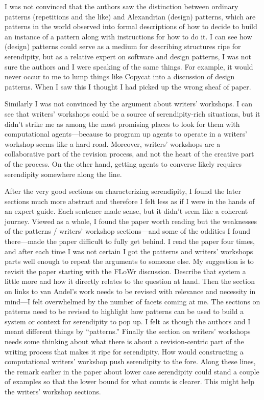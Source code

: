 I was not convinced that the authors saw the distinction between ordinary patterns (repetitions
and the like) and Alexandrian (design) patterns, which are patterns in the world observed into
formal descriptions of how to decide to build an instance of a pattern along with instructions for
how to do it. I can see how (design) patterns could serve as a medium for describing structures
ripe for serendipity, but as a relative expert on software and design patterns, I was not sure the
authors and I were speaking of the same things. For example, it would never occur to me to
lump things like Copycat into a discussion of design patterns. When I saw this I thought I had
picked up the wrong sheaf of paper.

Similarly I was not convinced by the argument about writers’ workshops. I can see that writers’
workshops could be a source of serendipity-rich situations, but it didn’t strike me as among the
most promising places to look for them with computational agents—because to program up
agents to operate in a writers’ workshop seems like a hard road. Moreover, writers’ workshops
are a collaborative part of the revision process, and not the heart of the creative part of the
process. On the other hand, getting agents to converse likely requires serendipity somewhere
along the line.

After the very good sections on characterizing serendipity, I found the later sections much more
abstract and therefore I felt less as if I were in the hands of an expert guide. Each sentence
made sense, but it didn’t seem like a coherent journey.
Viewed as a whole, I found the paper worth reading but the weaknesses of the patterns /
writers’ workshop sections—and some of the oddities I found there—made the paper difficult to
fully get behind. I read the paper four times, and after each time I was not certain I got the
patterns and writers’ workshops parts well enough to repeat the arguments to someone else.
My suggestion is to revisit the paper starting with the FLoWr discussion. Describe that system a
little more and how it directly relates to the question at hand. Then the section on links to van
Andel’s work needs to be revised with relevance and necessity in mind—I felt overwhelmed by
the number of facets coming at me. The sections on patterns need to be revised to highlight
how patterns can be used to build a system or context for serendipity to pop up. I felt as though
the authors and I meant different things by “patterns.” Finally the section on writers’ workshops
needs some thinking about what there is about a revision-centric part of the writing process that
makes it ripe for serendipity. How would constructing a computational writers’ workshop push
serendipity to the fore. Along these lines, the remark earlier in the paper about lower case
serendipity could stand a couple of examples so that the lower bound for what counts is clearer.
This might help the writers’ workshop sections.

